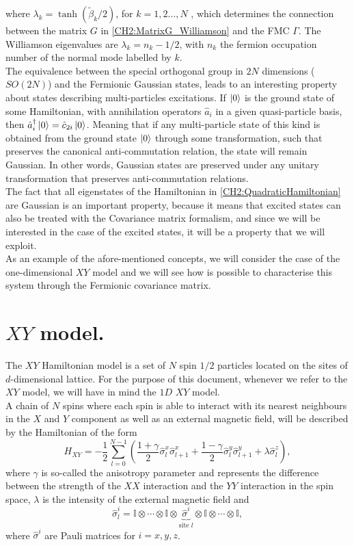 where $\lambda_k = \operatorname{tanh}(\tilde{\beta}_k/2)$, for $k=1,2\ldots,N$ \cite{kraus_pairing_2009}, which determines the connection between the matrix $G$ in \eqref{CH2:MatrixG_Williamson} and the FMC $\Gamma$. The Williamson eigenvalues are $\lambda_k=n_k -1/2$, with $n_k$ the fermion occupation number of the normal mode labelled by $k$. \\
\indent The equivalence between the special orthogonal group in $2N$ dimensions ($SO(2N)$) and the Fermionic Gaussian states, leads to an interesting  property about states describing multi-particles excitations. If $\mathinner{|{0}\rangle}$ is the ground state of some Hamiltonian, with annihilation operators $\hat{a}_{i}$ in a given quasi-particle basis, then $\hat{a}_{i}^{\dagger}\mathinner{|{0}\rangle} = \hat{c}_{2i}\mathinner{|{0}\rangle}$. Meaning that if any multi-particle state of this kind is obtained from the ground state $\mathinner{|{0}\rangle}$ through some transformation, such that preserves the canonical anti-commutation relation, the state will remain Gaussian. In other words, Gaussian states are preserved under any unitary transformation that preserves anti-commutation relations.\\
\indent The fact that all eigenstates of the Hamiltonian in \eqref{CH2:QuadraticHamiltonian} are Gaussian is an important property, because it means that excited states can also be treated with the Covariance matrix formalism, and since we will be interested in the case of the excited states, it will be a property that we will exploit.\\
\indent As an example of the afore-mentioned concepts, we will consider the case of the one-dimensional $XY$ model and we will see how is possible to characterise this system through the Fermionic covariance matrix. 
\section{$XY$ model.}
The $XY$ Hamiltonian model is a set of $N$ spin $1/2$ particles located on the sites of $d$-dimensional lattice. For the purpose of this document, whenever we refer to the $XY$ model, we will have in mind the $1D$ $XY$ model.\\
\indent A chain of $N$ spins where each spin is able to interact with its nearest neighbours in the $X$ and $Y$ component as well as an external magnetic field, will be described by the Hamiltonian of the form
\begin{equation}
H_{XY}=-\frac{1}{2} \sum_{l=0}^{N-1}\left(\frac{1+\gamma}{2} \hat{\sigma}_{l}^{x} \hat{\sigma}_{l+1}^{x}+\frac{1-\gamma}{2} \hat{\sigma}_{l}^{y} \hat{\sigma}_{l+1}^{y}+\lambda \hat{\sigma}_{l}^{z}\right),
\label{CH3:Hamiltonian_XY}
\end{equation}
where $\gamma$ is so-called the anisotropy parameter and represents the difference between the strength of the $XX$ interaction and the $YY$ interaction in the spin space, $\lambda$ is the intensity of the external magnetic field and
\begin{equation}
\hat{\sigma}^{i}_{l} = \mathbb{I}\otimes\cdots \otimes\mathbb{I}\otimes\underbrace{\hat{\sigma}^{i}}_{\text{site } l}\otimes\mathbb{I}\otimes\cdots\otimes\mathbb{I},
\end{equation}
where $\hat{\sigma}^{i}$ are Pauli matrices for $i=x, y, z$.
